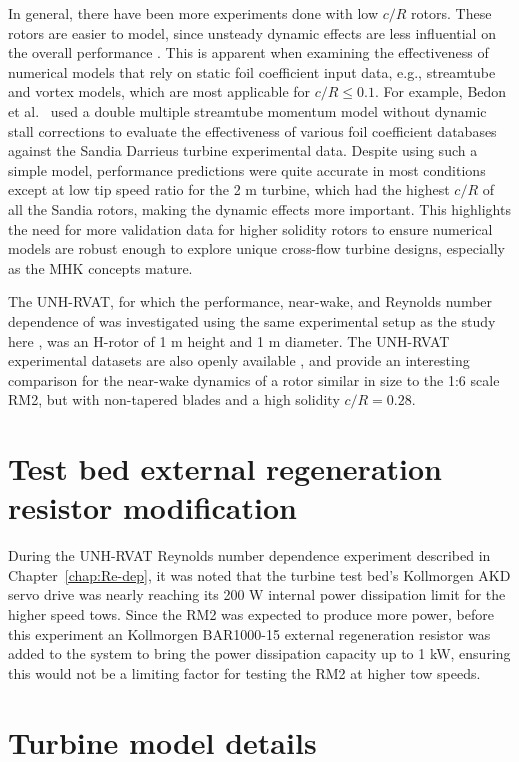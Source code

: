 In general, there have been more experiments done with low $c/R$ rotors. These
rotors are easier to model, since unsteady dynamic effects are less influential
on the overall performance \cite{Strickland1981}. This is apparent when
examining the effectiveness of numerical models that rely on static foil
coefficient input data, e.g., streamtube and vortex models, which are most
applicable for $c/R \leq 0.1$. For example, Bedon et al.~\cite{Bedon2014}
used a double multiple streamtube momentum model without dynamic stall
corrections to evaluate the effectiveness of various foil coefficient databases
against the Sandia Darrieus turbine experimental data. Despite using such a
simple model, performance predictions were quite accurate in most conditions
except at low tip speed ratio for the 2 m turbine, which had the highest $c/R$
of all the Sandia rotors, making the dynamic effects more important. This
highlights the need for more validation data for higher solidity rotors to
ensure numerical models are robust enough to explore unique cross-flow turbine
designs, especially as the MHK concepts mature.

The UNH-RVAT, for which the performance, near-wake, and Reynolds number
dependence of was investigated using the same experimental setup as the study
here \cite{Bachant2015-JoT, Bachant2016-Energies}, was an H-rotor of 1 m height
and 1 m diameter. The UNH-RVAT experimental datasets are also openly available
\cite{Bachant2014-RVAT-baseline, Bachant2016-RVAT-Re-dep}, and provide an
interesting comparison for the near-wake dynamics of a rotor similar in size to
the 1:6 scale RM2, but with non-tapered blades and a high solidity $c/R = 0.28$.


\section{Test bed external regeneration resistor modification}

During the UNH-RVAT Reynolds number dependence experiment described in
Chapter~\ref{chap:Re-dep}, it was noted that the turbine test bed's Kollmorgen
AKD servo drive was nearly reaching its 200 W internal power dissipation limit
for the higher speed tows. Since the RM2 was expected to produce more power,
before this experiment an Kollmorgen BAR1000-15 external regeneration resistor
was added to the system to bring the power dissipation capacity up to 1 kW,
ensuring this would not be a limiting factor for testing the RM2 at higher tow
speeds.


\section{Turbine model details}

